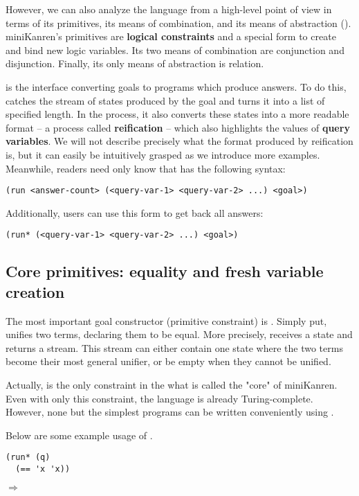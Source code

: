 However, we can also analyze the language from a high-level point of view in terms of its primitives, its means of combination, and its means of abstraction (\cite[359]{sicp}). miniKanren's primitives are \textbf{logical constraints} and a special form to create and bind new logic variables. Its two means of combination are conjunction and disjunction. Finally, its only means of abstraction is relation.

 is the interface converting goals to programs which produce answers. To do this,  catches the stream of states produced by the goal and turns it into a list of specified length. In the process, it also converts these states into a more readable format -- a process called \textbf{reification} -- which also highlights the values of \textbf{query variables}. We will not describe precisely what the format produced by reification is, but it can easily be intuitively grasped as we introduce more examples. Meanwhile, readers need only know that  has the following syntax:
\lstset{language=Scheme, showstringspaces=false, breaklines=true}
\begin{lstlisting}
(run <answer-count> (<query-var-1> <query-var-2> ...) <goal>)
\end{lstlisting}

Additionally, users can use this form to get back all answers:
\begin{lstlisting}
(run* (<query-var-1> <query-var-2> ...) <goal>)
\end{lstlisting}

\subsection{Core primitives: equality and fresh variable creation}
The most important goal constructor (primitive constraint) is \code{==}.
Simply put, \code{==} unifies two terms, declaring them to be equal. More precisely, \code{==} receives a state and returns a stream. This stream can either contain one state where the two terms become their most general unifier, or be empty when they cannot be unified.

Actually, \code{==} is the only constraint in the what is called the "core" of miniKanren. Even with only this constraint, the language is already Turing-complete. However, none but the simplest programs can be written conveniently using \code{==}.

Below are some example usage of \code{==}.
\begin{lstlisting}
(run* (q)
  (== 'x 'x))
\end{lstlisting}
$\Rightarrow$ 

